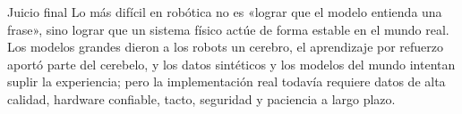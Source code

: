 \begin{importantbox}{Juicio final}
Lo más difícil en robótica no es «lograr que el modelo entienda una frase», sino lograr que un sistema físico actúe de forma estable en el mundo real. Los modelos grandes dieron a los robots un cerebro, el aprendizaje por refuerzo aportó parte del cerebelo, y los datos sintéticos y los modelos del mundo intentan suplir la experiencia; pero la implementación real todavía requiere datos de alta calidad, hardware confiable, tacto, seguridad y paciencia a largo plazo.
\end{importantbox}


